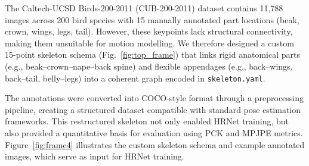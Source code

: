 \documentclass[final-report]{report-template}
\begin{document}






The Caltech-UCSD Birds-200-2011 (CUB-200-2011) dataset contains 11,788 images across 200 bird species with 15 manually annotated part locations (beak, crown, wings, legs, tail). However, these keypoints lack structural connectivity, making them unsuitable for motion modelling. We therefore designed a custom 15-point skeleton schema (Fig.~\ref{fig:top_frame}) that links rigid anatomical parts (e.g., beak–crown–nape–back spine) and flexible appendages (e.g., back–wings, back–tail, belly–legs) into a coherent graph encoded in \texttt{skeleton.yaml}.  

The annotations were converted into COCO-style format through a preprocessing pipeline, creating a structured dataset compatible with standard pose estimation frameworks. This restructured skeleton not only enabled HRNet training, but also provided a quantitative basis for evaluation using PCK and MPJPE metrics. Figure~\ref{fig:frame4} illustrates the custom skeleton schema and example annotated images, which serve as input for HRNet training.  
\end{document}
